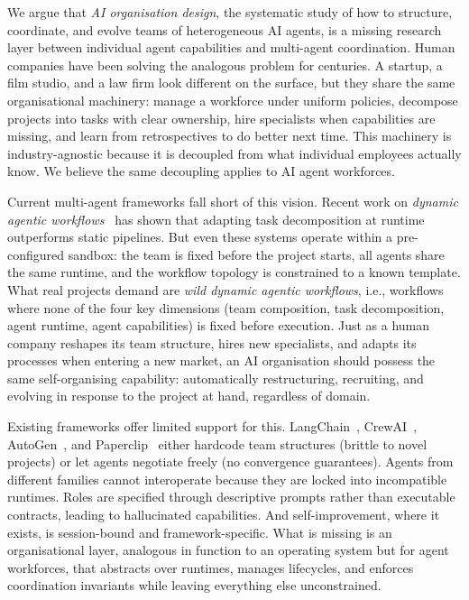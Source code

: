 \documentclass[11pt,a4paper]{article}
\begin{document}
We argue that \emph{AI organisation design}, the systematic study of how to structure, coordinate, and evolve teams of heterogeneous AI agents, is a missing research layer between individual agent capabilities and multi-agent coordination.  Human companies have been solving the analogous problem for centuries.  A startup, a film studio, and a law firm look different on the surface, but they share the same organisational machinery: manage a workforce under uniform policies, decompose projects into tasks with clear ownership, hire specialists when capabilities are missing, and learn from retrospectives to do better next time.  This machinery is industry-agnostic because it is decoupled from what individual employees actually know.  We believe the same decoupling applies to AI agent workforces.

Current multi-agent frameworks fall short of this vision.  Recent work on \emph{dynamic agentic workflows}~\cite{wang2025tdag, erdogan2025planact, hu2025evomac} has shown that adapting task decomposition at runtime outperforms static pipelines.  But even these systems operate within a pre-configured sandbox: the team is fixed before the project starts, all agents share the same runtime, and the workflow topology is constrained to a known template.  What real projects demand are \emph{wild dynamic agentic workflows}, i.e., workflows where none of the four key dimensions (team composition, task decomposition, agent runtime, agent capabilities) is fixed before execution.  Just as a human company reshapes its team structure, hires new specialists, and adapts its processes when entering a new market, an AI organisation should possess the same self-organising capability: automatically restructuring, recruiting, and evolving in response to the project at hand, regardless of domain.

Existing frameworks offer limited support for this.  LangChain~\cite{langchain2024deepagents}, CrewAI~\cite{crewai}, AutoGen~\cite{autogen}, and Paperclip~\cite{paperclip2025} either hardcode team structures (brittle to novel projects) or let agents negotiate freely (no convergence guarantees).  Agents from different families cannot interoperate because they are locked into incompatible runtimes.  Roles are specified through descriptive prompts rather than executable contracts, leading to hallucinated capabilities.  And self-improvement, where it exists, is session-bound and framework-specific.  What is missing is an organisational layer, analogous in function to an operating system but for agent workforces, that abstracts over runtimes, manages lifecycles, and enforces coordination invariants while leaving everything else unconstrained.
\end{document}
